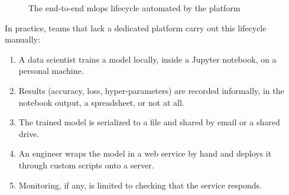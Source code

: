 \begin{figure}[H]\centering
{}
\caption{The end-to-end \gls{mlops} lifecycle automated by the platform}
\label{fig:mlops-lifecycle}
\end{figure}

In practice, teams that lack a dedicated platform carry out this lifecycle
manually:
\begin{enumerate}[leftmargin=1.6em]
  \item A data scientist trains a model locally, inside a Jupyter notebook, on a
        personal machine.
  \item Results (accuracy, loss, hyper-parameters) are recorded informally, in the
        notebook output, a spreadsheet, or not at all.
  \item The trained model is serialized to a file and shared by email or a shared
        drive.
  \item An engineer wraps the model in a web service by hand and deploys it through
        custom scripts onto a server.
  \item Monitoring, if any, is limited to checking that the service responds.
\end{enumerate}

